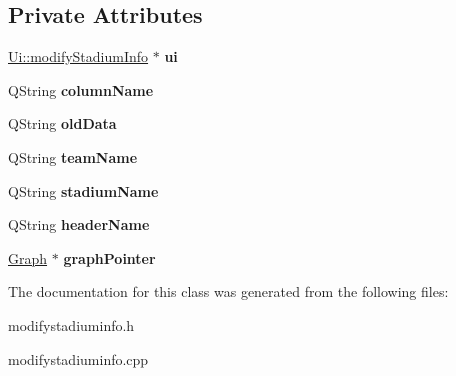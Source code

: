 \subsection*{Private Attributes}
\begin{DoxyCompactItemize}
\item 
\mbox{\label{classmodify_stadium_info_a10921671cbb93fe25e5db567cf2f8dc7}} 
\hyperlink{class_ui_1_1modify_stadium_info}{Ui\+::modify\+Stadium\+Info} $\ast$ {\bfseries ui}
\item 
\mbox{\label{classmodify_stadium_info_a68547f655a7f4bc840e578c5de3593a9}} 
Q\+String {\bfseries column\+Name}
\item 
\mbox{\label{classmodify_stadium_info_a1d14f67075046a43a14e975ad6c83f42}} 
Q\+String {\bfseries old\+Data}
\item 
\mbox{\label{classmodify_stadium_info_a726677f98d05e27240a8cc03abae610d}} 
Q\+String {\bfseries team\+Name}
\item 
\mbox{\label{classmodify_stadium_info_ade8d9485377ee4463c185dec5e3578ba}} 
Q\+String {\bfseries stadium\+Name}
\item 
\mbox{\label{classmodify_stadium_info_a1279d3056e97969d6acb39662175449e}} 
Q\+String {\bfseries header\+Name}
\item 
\mbox{\label{classmodify_stadium_info_a2c1ff2aca89b2d5bf2e945475ae01ed3}} 
\hyperlink{class_graph}{Graph} $\ast$ {\bfseries graph\+Pointer}
\end{DoxyCompactItemize}


The documentation for this class was generated from the following files\+:\begin{DoxyCompactItemize}
\item 
modifystadiuminfo.\+h\item 
modifystadiuminfo.\+cpp\end{DoxyCompactItemize}
